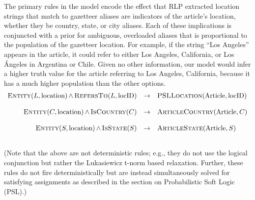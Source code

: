 \documentclass[letterpaper]{article}
\begin{document}
The primary rules in the model encode the effect that RLP extracted
location strings that match to gazetteer aliases are indicators of the
article's location, whether they be country, state, or city aliases.
Each of these implications is conjuncted with a prior for ambiguous,
overloaded aliases that is proportional to the population of the
gazetteer location. For example, if the string ``Los Angeles'' appears
in the article, it could refer to either Los Angeles, California, or Los
\'{A}ngeles in Argentina or Chile. Given no other information, our model
would infer a higher truth value for the article referring to Los
Angeles, California, because it has a much higher population than the
other options. 
\begin{equation*}
  \begin{array}{rcl}
  \textsc{Entity}(L, \textrm{location}) \softand \textsc{RefersTo}(L,\textrm{locID}) & \rightarrow & \textsc{PSLLocation}(\textrm{Article}, \textrm{locID})\\
  \\
  \textsc{Entity}(C, \textrm{location}) \softand \textsc{IsCountry}(C)               & \rightarrow & \textsc{ArticleCountry}(\textrm{Article}, C)\\
  \\
  \textsc{Entity}(S, \textrm{location}) \softand \textsc{IsState}(S)                 & \rightarrow & \textsc{ArticleState}(\textrm{Article}, S)\\
  \\
  \end{array}
\end{equation*}

\noindent
(Note that the above are not deterministic rules; e.g., they do not use
the logical conjunction but rather the Lukasiewicz t-norm based
relaxation. Further, these rules do not fire deterministically but are
instead simultaneously solved for satisfying assignments as described in
the section on Probabilistic Soft Logic (PSL).)
\end{document}
